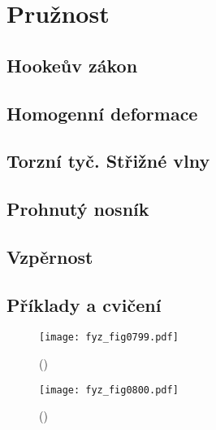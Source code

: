 \setchaptertoc
\chapter{Pružnost}\label{fyz:IIchapIIXL}

  \section{Hookeův zákon}\label{fyz:IIchapIIXLsecI}
  \section{Homogenní deformace}\label{fyz:IIchapIIXLsecII}
  \section{Torzní tyč. Střižné vlny}\label{fyz:IIchapIIXLsecIII}
  \section{Prohnutý nosník}\label{fyz:IIchapIIXLsecIV}
  \section{Vzpěrnost}\label{fyz:IIchapIIXLsecV}
  \section{Příklady a cvičení}\label{fyz:IIchapIIXLsecVI}
  

    \begin{figure}[ht!] %
      \centering
      \texttt{[image: fyz\_fig0799.pdf]}
      \caption{
               (\cite[s.~707]{Feynman02})}
      \label{fyz:fig0799}
    \end{figure}
    
    \begin{figure}[ht!] %
      \centering
      \texttt{[image: fyz\_fig0800.pdf]}
      \caption{
               (\cite[s.~707]{Feynman02})}
      \label{fyz:fig0800}
    \end{figure}


